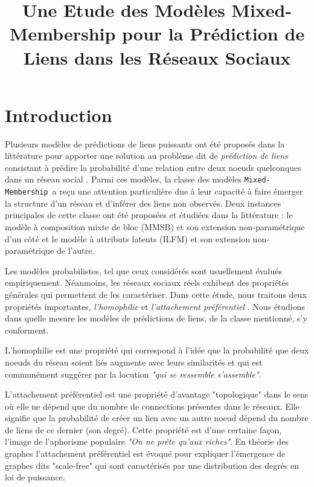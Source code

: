 \documentclass[french]{hermes-journal}
\title[]{Une Etude des Modèles Mixed-Membership pour la Prédiction de Liens dans les Réseaux Sociaux}
\newcommand{\mmm}{\texttt{Mixed-Membership}~}
\begin{document}
\maketitle

\newpage






\section{Introduction}

\label{sec:intro}

Plusieurs modèles de prédictions de liens puissants ont été proposés dans la littérature pour apporter une solution au problème dit de \textit{prédiction de liens} consistant à prédire la probabilité d'une relation entre deux noeuds quelconques dans un réseau social \cite{LibenNowell07, HassanZaki11}.
Parmi ces modèles, la classe des modèles \mmm a reçu une attention particulière due à leur capacité à faire émerger la structure d'un réseau et d'inférer des liens non observés.
Deux instances principales de cette classe ont été proposées et étudiées  dans la littérature : le modèle à composition mixte de bloc (MMSB) \cite{MMSB} et son extension non-paramétrique \cite{iMMSB, fan2015dynamic} d'un côté et le modèle à attributs latents (ILFM) \cite{BMF} et son extension non-paramétrique \cite{ILFRM} de l'autre. 


Les modèles probabilistes, tel que ceux considérés sont usuellement évalués empiriquement. Néanmoins, les réseaux sociaux réels exhibent des propriétés générales qui permettent de les caractériser. Dans cette étude, nous traitons deux propriétés importantes, \textit{l'homophilie} et \textit{l'attachement préférentiel} \cite{Newman2010, Barabasi2003}. Nous étudions dans quelle mesure les modèles de prédictions de liens, de la classe mentionné, s'y conforment.

L'homophilie est une propriété qui correspond à l'idée que la probabilité que deux noeuds du réseau soient liés augmente avec leurs similarités et qui est communément suggérer par la locution \emph{"qui se ressemble s'assemble"}.

L'attachement préférentiel est une propriété d'avantage "topologique" dans le sens où elle ne dépend que du nombre de connections présentes dans le réseaux. Elle signifie que la probabilité de créer un lien avec un autre noeud dépend du nombre de liens de ce dernier (son degré). Cette propriété est d'une certaine façon, l'image de l'aphorisme populaire \emph{"On ne prête qu'aux riches"}. En théorie des graphes l'attachement préférentiel est évoqué pour expliquer l'émergence de graphes dits "scale-free" qui sont caractérisés par une distribution des degrés en loi de puissance.
\end{document}
